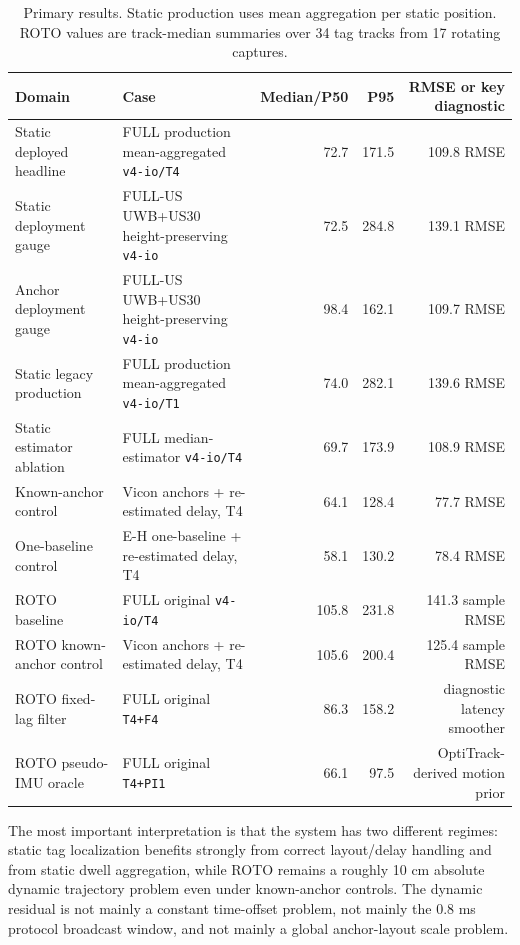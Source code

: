 \documentclass[11pt,a4paper]{article}
\newcommand{\case}[1]{\texttt{#1}}
\newcommand{\tight}{\setlength{\tabcolsep}{4pt}\renewcommand{\arraystretch}{1.12}}
\begin{document}
\begin{table}[H]
\centering
\tight
\caption{Primary results.  Static production uses mean aggregation per static position.
ROTO values are track-median summaries over 34 tag tracks from 17 rotating captures.}
\begin{tabularx}{\textwidth}{lXrrr}
\toprule
Domain & Case & Median/P50 & P95 & RMSE or key diagnostic \\
\midrule
Static deployed headline & FULL production mean-aggregated \case{v4-io/T4} & 72.7 & 171.5 & 109.8 RMSE \\
Static deployment gauge & FULL-US UWB+US30 height-preserving \case{v4-io} & 72.5 & 284.8 & 139.1 RMSE \\
Anchor deployment gauge & FULL-US UWB+US30 height-preserving \case{v4-io} & 98.4 & 162.1 & 109.7 RMSE \\
Static legacy production & FULL production mean-aggregated \case{v4-io/T1} & 74.0 & 282.1 & 139.6 RMSE \\
Static estimator ablation & FULL median-estimator \case{v4-io/T4} & 69.7 & 173.9 & 108.9 RMSE \\
Known-anchor control & Vicon anchors + re-estimated delay, T4 & 64.1 & 128.4 & 77.7 RMSE \\
One-baseline control & E-H one-baseline + re-estimated delay, T4 & 58.1 & 130.2 & 78.4 RMSE \\
ROTO baseline & FULL original \case{v4-io/T4} & 105.8 & 231.8 & 141.3 sample RMSE \\
ROTO known-anchor control & Vicon anchors + re-estimated delay, T4 & 105.6 & 200.4 & 125.4 sample RMSE \\
ROTO fixed-lag filter & FULL original \case{T4+F4} & 86.3 & 158.2 & diagnostic latency smoother \\
ROTO pseudo-IMU oracle & FULL original \case{T4+PI1} & 66.1 & 97.5 & OptiTrack-derived motion prior \\
\bottomrule
\end{tabularx}
\end{table}

The most important interpretation is that the system has two different regimes:
static tag localization benefits strongly from correct layout/delay handling and
from static dwell aggregation, while ROTO remains a roughly 10 cm absolute dynamic
trajectory problem even under known-anchor controls.  The dynamic residual is not
mainly a constant time-offset problem, not mainly the 0.8 ms protocol broadcast
window, and not mainly a global anchor-layout scale problem.
\end{document}
